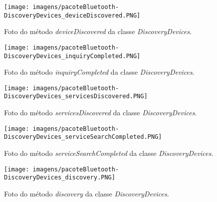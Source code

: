 \begin{figure}[!ht]
\centering
\caption{Foto do método \textit{deviceDiscovered} da classe \textit{DiscoveryDevices}.} 
{\texttt{[image: imagens/pacoteBluetooth-DiscoveryDevices\_deviceDiscovered.PNG]}}\\
 \label{Fig:device_discovered}
\end{figure}

\begin{figure}[!ht]
\centering
\caption{Foto do método \textit{inquiryCompleted} da classe \textit{DiscoveryDevices}.} 
{\texttt{[image: imagens/pacoteBluetooth-DiscoveryDevices\_inquiryCompleted.PNG]}}\\
 \label{Fig:inquiry_completed}
\end{figure}

\begin{figure}[!ht]
\centering
\caption{Foto do método \textit{servicesDiscovered} da classe \textit{DiscoveryDevices}.} 
{\texttt{[image: imagens/pacoteBluetooth-DiscoveryDevices\_servicesDiscovered.PNG]}}\\
 \label{Fig:services_discovered}
\end{figure}

\begin{figure}[!ht]
\centering
\caption{Foto do método \textit{serviceSearchCompleted} da classe \textit{DiscoveryDevices}.} 
{\texttt{[image: imagens/pacoteBluetooth-DiscoveryDevices\_serviceSearchCompleted.PNG]}}\\
 \label{Fig:service_search_completed}
\end{figure}

\begin{figure}[!ht]
\centering
\caption{Foto do método \textit{discovery} da classe \textit{DiscoveryDevices}.} 
{\texttt{[image: imagens/pacoteBluetooth-DiscoveryDevices\_discovery.PNG]}}\\
 \label{Fig:discovery}
\end{figure}

